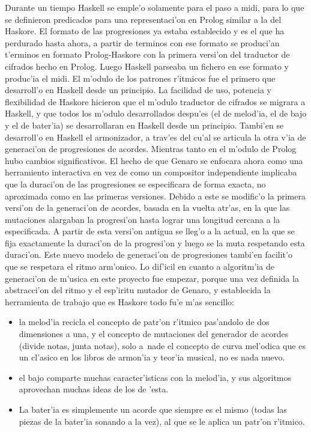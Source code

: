 \documentclass[a4paper,11pt]{article}
\begin{document}
\begin{itemize}
\newline
Durante un tiempo Haskell se emple'o solamente para el paso a midi, para lo que se definieron predicados para una representaci'on en Prolog similar a la del Haskore. El formato de las progresiones ya estaba establecido y es el que ha perdurado hasta ahora, a partir de terminos con ese formato se produci'an t'erminos en formato Prolog-Haskore con la primera versi'on del traductor de cifrados hecho en Prolog. Luego Haskell parseaba un fichero en ese formato y produc'ia el midi. El m'odulo de los patrones r'itmicos fue el primero que desarroll'o en Haskell desde un principio. La facilidad de uso, potencia y flexibilidad de Haskore hicieron que el m'odulo traductor de cifrados se migrara a Haskell, y que todos los m'odulo desarrollados despu'es (el de melod'ia, el de bajo y el de bater'ia) se desarrollaran en Haskell desde un principio. Tambi'en se desarroll'o en Haskell el armonizador, a trav'es del cu'al se articula la otra v'ia de generaci'on de progresiones de acordes.
\newline
Mientras tanto en el m'odulo de Prolog hubo cambios significativos. El hecho de que Genaro se enfocara ahora como una herramiento interactiva en vez de como un compositor independiente implicaba que la duraci'on de las progresiones se especificara de forma exacta, no aproximada como en las primeras versiones. Debido a este se modific'o la primera versi'on de la generaci'on de acordes, basada en la vuelta atr'as, en la que las mutaciones alargaban la progresi'on hasta lograr una longitud cercana a la especificada. A partir de esta versi'on antigua se lleg'o a la actual, en la que se fija exactamente la duraci'on de la progresi'on y luego se la muta respetando esta duraci'on. Este nuevo modelo de generaci'on de progresiones tambi'en facilit'o que se respetara el ritmo arm'onico.
\newline
Lo dif'icil en cuanto a algoritm'ia de generaci'on de m'usica en este proyecto fue empezar, porque una vez definida la abstracci'on del ritmo y el esp'iritu mutador de Genaro, y establecida la herramienta de trabajo que es Haskore todo fu'e m'as sencillo:
                \begin{itemize}
                \item la melod'ia recicla el concepto de patr'on r'itmico pas'andolo de dos dimensiones a una, y el concepto de mutaciones del generador de acordes (divide notas, junta notas), solo a~nade el concepto de curva mel'odica que es un cl'asico en los libros de armon'ia y teor'ia musical, no es nada nuevo. 
                \item el bajo comparte muchas caracter'isticas con la melod'ia, y sus algoritmos aprovechan muchas ideas de los de 'esta.
                \item La bater'ia es simplemente un acorde que siempre es el mismo (todas las piezas de la bater'ia sonando a la vez), al que se le aplica un patr'on r'itmico.
                \end{itemize}


\end{itemize}
\end{document}
